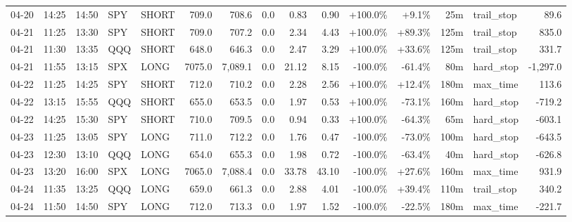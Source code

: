 \documentclass[11pt,a4paper,twoside]{article}
\begin{document}
\begin{landscape}
\begin{center}
\begin{longtable}{>{\color{txtmain}}l l l l l r r r r r r r r >{\color{txtmain}}l r}
04-20 & 14:25 & 14:50 & SPY & SHORT & 709.0 & 708.6 & 0.0 & 0.83 & 0.90 & \textcolor{wingreen}{+100.0\%} & \textcolor{wingreen}{+9.1\%} & 25m & trail\_stop & \textcolor{wingreen}{89.6} \\
04-21 & 11:25 & 13:30 & SPY & SHORT & 709.0 & 707.2 & 0.0 & 2.34 & 4.43 & \textcolor{wingreen}{+100.0\%} & \textcolor{wingreen}{+89.3\%} & 125m & trail\_stop & \textcolor{wingreen}{835.0} \\
04-21 & 11:30 & 13:35 & QQQ & SHORT & 648.0 & 646.3 & 0.0 & 2.47 & 3.29 & \textcolor{wingreen}{+100.0\%} & \textcolor{wingreen}{+33.6\%} & 125m & trail\_stop & \textcolor{wingreen}{331.7} \\
04-21 & 11:55 & 13:15 & SPX & LONG & 7075.0 & 7,089.1 & 0.0 & 21.12 & 8.15 & \textcolor{lossred}{-100.0\%} & \textcolor{lossred}{-61.4\%} & 80m & hard\_stop & \textcolor{lossred}{-1,297.0} \\
04-22 & 11:25 & 14:25 & SPY & SHORT & 712.0 & 710.2 & 0.0 & 2.28 & 2.56 & \textcolor{wingreen}{+100.0\%} & \textcolor{wingreen}{+12.4\%} & 180m & max\_time & \textcolor{wingreen}{113.6} \\
04-22 & 13:15 & 15:55 & QQQ & SHORT & 655.0 & 653.5 & 0.0 & 1.97 & 0.53 & \textcolor{wingreen}{+100.0\%} & \textcolor{lossred}{-73.1\%} & 160m & hard\_stop & \textcolor{lossred}{-719.2} \\
04-22 & 14:25 & 15:30 & SPY & SHORT & 710.0 & 709.5 & 0.0 & 0.94 & 0.33 & \textcolor{wingreen}{+100.0\%} & \textcolor{lossred}{-64.3\%} & 65m & hard\_stop & \textcolor{lossred}{-603.1} \\
04-23 & 11:25 & 13:05 & SPY & LONG & 711.0 & 712.2 & 0.0 & 1.76 & 0.47 & \textcolor{lossred}{-100.0\%} & \textcolor{lossred}{-73.0\%} & 100m & hard\_stop & \textcolor{lossred}{-643.5} \\
04-23 & 12:30 & 13:10 & QQQ & LONG & 654.0 & 655.3 & 0.0 & 1.98 & 0.72 & \textcolor{lossred}{-100.0\%} & \textcolor{lossred}{-63.4\%} & 40m & hard\_stop & \textcolor{lossred}{-626.8} \\
04-23 & 13:20 & 16:00 & SPX & LONG & 7065.0 & 7,088.4 & 0.0 & 33.78 & 43.10 & \textcolor{lossred}{-100.0\%} & \textcolor{wingreen}{+27.6\%} & 160m & max\_time & \textcolor{wingreen}{931.9} \\
04-24 & 11:35 & 13:25 & QQQ & LONG & 659.0 & 661.3 & 0.0 & 2.88 & 4.01 & \textcolor{lossred}{-100.0\%} & \textcolor{wingreen}{+39.4\%} & 110m & trail\_stop & \textcolor{wingreen}{340.2} \\
04-24 & 11:50 & 14:50 & SPY & LONG & 712.0 & 713.3 & 0.0 & 1.97 & 1.52 & \textcolor{lossred}{-100.0\%} & \textcolor{lossred}{-22.5\%} & 180m & max\_time & \textcolor{lossred}{-221.7} \\

\end{longtable}
\end{center}
\end{landscape}
\end{document}
